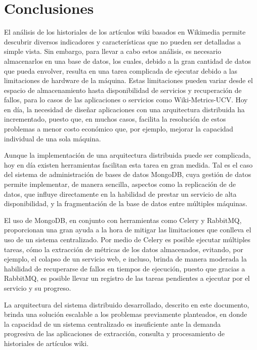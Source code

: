 \section{Conclusiones}

El análisis de los historiales de los artículos wiki basados en Wikimedia permite
descubrir diversos indicadores y características que no pueden ser detalladas a simple
vista.
Sin embargo, para llevar a cabo estos análisis, es necesario almacenarlos en una base
de datos, los cuales, debido a la gran cantidad de datos que pueda envolver, resulta
en una tarea complicada de ejecutar debido a las limitaciones de hardware de la
máquina.
Estas limitaciones pueden variar desde el espacio de almacenamiento hasta disponibilidad
de servicios y recuperación de fallos, para lo casos de las aplicaciones o servicios como
Wiki-Metrics-UCV.
Hoy en día, la necesidad de diseñar aplicaciones con una arquitectura distribuida
ha incrementado, puesto que, en muchos casos, facilita la resolución de estos problemas
a menor costo económico que, por ejemplo, mejorar la capacidad individual de una sola máquina.

Aunque la implementación de una arquitectura distribuida puede ser complicada,
hoy en día existen herramientas facilitan esta tarea en gran medida.
Tal es el caso del sistema de administración de bases de datos MongoDB, cuya gestión
de datos permite implementar, de manera sencilla, aspectos como la replicación de
de datos, que influye directamente en la habilidad de prestar un servicio de alta disponibilidad,
y la fragmentación de la base de datos entre múltiples máquinas.

El uso de MongoDB, en conjunto con herramientas como Celery y RabbitMQ, proporcionan
una gran ayuda a la hora de mitigar las limitaciones que conlleva el uso de un sistema centralizado.
Por medio de Celery es posible ejecutar múltiples tareas, cómo la extracción de métricas de los
datos almacenados, evitando, por ejemplo, el colapso de un servicio web, e incluso, brinda
de manera moderada la habilidad de recuperarse de fallos en tiempos de ejecución, puesto que gracias a RabbitMQ,
es posible llevar un registro de las tareas pendientes a ejecutar por el servicio y su progreso.

La arquitectura del sistema distribuido desarrollado, descrito en este documento, brinda
una solución escalable a los problemas previamente planteados, en donde la capacidad
de un sistema centralizado es insuficiente ante la demanda progresiva de las aplicaciones de
extracción, consulta y procesamiento de historiales de artículos wiki.
